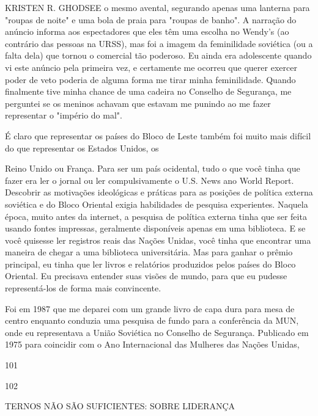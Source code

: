  \par 
KRISTEN R. GHODSEE o mesmo avental, segurando apenas uma lanterna para "roupas de noite" e uma bola de praia para "roupas de banho". A narração do anúncio informa aos espectadores que eles têm uma escolha no Wendy's (ao contrário das pessoas na URSS), mas foi a imagem da feminilidade soviética (ou a falta dela) que tornou o comercial tão poderoso. Eu ainda era adolescente quando vi este anúncio pela primeira vez, e certamente me ocorreu que querer exercer poder de veto poderia de alguma forma me tirar minha feminilidade. Quando finalmente tive minha chance de uma cadeira no Conselho de Segurança, me perguntei se os meninos achavam que estavam me punindo ao me fazer representar o "império do mal".
 \par 
É claro que representar os países do Bloco de Leste também foi muito mais difícil do que representar os Estados Unidos, os
 \par 
Reino Unido ou França. Para ser um país ocidental, tudo o que você tinha que fazer era ler o jornal ou ler compulsivamente o U.S. News ano World Report. Descobrir as motivações ideológicas e práticas para as posições de política externa soviética e do Bloco Oriental exigia habilidades de pesquisa experientes. Naquela época, muito antes da internet, a pesquisa de política externa tinha que ser feita usando fontes impressas, geralmente disponíveis apenas em uma biblioteca. E se você quisesse ler registros reais das Nações Unidas, você tinha que encontrar uma maneira de chegar a uma biblioteca universitária. Mas para ganhar o prêmio principal, eu tinha que ler livros e relatórios produzidos pelos países do Bloco Oriental. Eu precisava entender suas visões de mundo, para que eu pudesse representá-los de forma mais convincente.
 \par 
Foi em 1987 que me deparei com um grande livro de capa dura para mesa de centro enquanto conduzia uma pesquisa de fundo para a conferência da MUN, onde eu representava a União Soviética no Conselho de Segurança. Publicado em 1975 para coincidir com o Ano Internacional das Mulheres das Nações Unidas,
 \par 
101
 \par 
102
 \par 
TERNOS NÃO SÃO SUFICIENTES: SOBRE LIDERANÇA
 \par 
